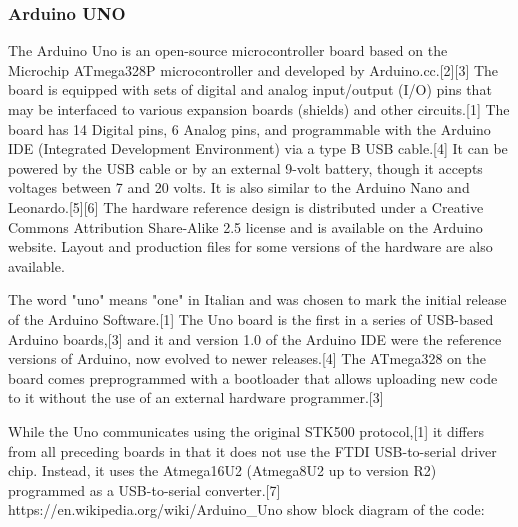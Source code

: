 \subsubsection{Arduino UNO}
The Arduino Uno is an open-source microcontroller board based on the Microchip ATmega328P microcontroller and developed by Arduino.cc.[2][3] The board is equipped with sets of digital and analog input/output (I/O) pins that may be interfaced to various expansion boards (shields) and other circuits.[1] The board has 14 Digital pins, 6 Analog pins, and programmable with the Arduino IDE (Integrated Development Environment) via a type B USB cable.[4] It can be powered by the USB cable or by an external 9-volt battery, though it accepts voltages between 7 and 20 volts. It is also similar to the Arduino Nano and Leonardo.[5][6] The hardware reference design is distributed under a Creative Commons Attribution Share-Alike 2.5 license and is available on the Arduino website. Layout and production files for some versions of the hardware are also available.

The word "uno" means "one" in Italian and was chosen to mark the initial release of the Arduino Software.[1] The Uno board is the first in a series of USB-based Arduino boards,[3] and it and version 1.0 of the Arduino IDE were the reference versions of Arduino, now evolved to newer releases.[4] The ATmega328 on the board comes preprogrammed with a bootloader that allows uploading new code to it without the use of an external hardware programmer.[3]

While the Uno communicates using the original STK500 protocol,[1] it differs from all preceding boards in that it does not use the FTDI USB-to-serial driver chip. Instead, it uses the Atmega16U2 (Atmega8U2 up to version R2) programmed as a USB-to-serial converter.[7]
https://en.wikipedia.org/wiki/Arduino_Uno
show block diagram of the code:


